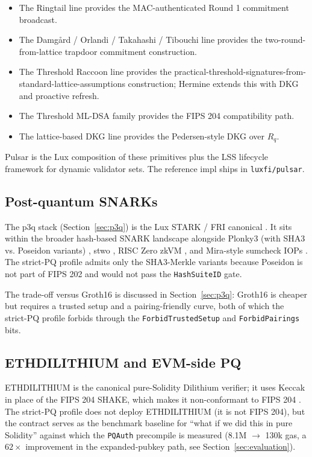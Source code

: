 \begin{itemize}[leftmargin=2em,nosep]
  \item The Ringtail line \cite{ringtail} provides the MAC-authenticated
    Round 1 commitment broadcast.
  \item The Damgård / Orlandi / Takahashi / Tibouchi line
    \cite{damgard2021} provides the two-round-from-lattice trapdoor
    commitment construction.
  \item The Threshold Raccoon line \cite{thresholdraccoon} provides the
    practical-threshold-signatures-from-standard-lattice-assumptions
    construction; Hermine \cite{hermine} extends this with DKG and
    proactive refresh.
  \item The Threshold ML-DSA family \cite{tmldsa2025} provides the
    FIPS 204 compatibility path.
  \item The lattice-based DKG line \cite{krt24,gks24} provides the
    Pedersen-style DKG over $R_q$.
\end{itemize}

Pulsar is the Lux composition of these primitives plus the LSS lifecycle
framework \cite{luxlssmpc} for dynamic validator sets. The reference impl
ships in \texttt{luxfi/pulsar}.

\subsection{Post-quantum SNARKs}

The p3q stack (Section~\ref{sec:p3q}) is the Lux STARK / FRI canonical
\cite{lp137}. It sits within the broader hash-based SNARK landscape
alongside Plonky3 (with SHA3 vs. Poseidon variants) \cite{plonky3}, stwo
\cite{stwo}, RISC Zero zkVM \cite{riscZero}, and Mira-style sumcheck IOPs
\cite{mira}. The strict-PQ profile admits only the SHA3-Merkle variants
because Poseidon \cite{poseidon} is not part of FIPS 202 and would not pass
the \texttt{HashSuiteID} gate.

The trade-off versus Groth16 \cite{groth2016} is discussed in
Section~\ref{sec:p3q}: Groth16 is cheaper but requires a trusted setup and
a pairing-friendly curve, both of which the strict-PQ profile forbids
through the \texttt{ForbidTrustedSetup} and \texttt{ForbidPairings} bits.

\subsection{ETHDILITHIUM and EVM-side PQ}

ETHDILITHIUM \cite{ethdilithium} is the canonical pure-Solidity Dilithium
verifier; it uses Keccak in place of the FIPS 204 SHAKE, which makes it
non-conformant to FIPS 204 \cite{fips204}. The strict-PQ profile does not
deploy ETHDILITHIUM (it is not FIPS 204), but the contract serves as the
benchmark baseline for ``what if we did this in pure Solidity'' against
which the \texttt{PQAuth} precompile is measured (8.1M $\to$ 130k gas, a
$62\times$ improvement in the expanded-pubkey path, see
Section~\ref{sec:evaluation}).

